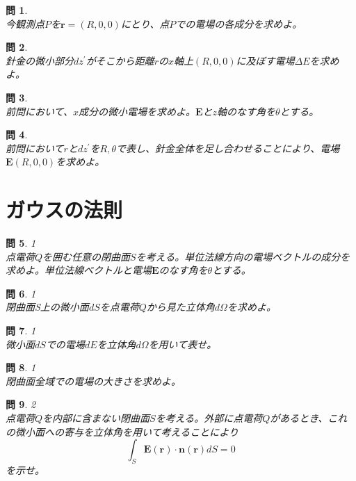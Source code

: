 \documentclass{jsarticle}
\newtheorem{pro}{問}[section]
\begin{document}
\begin{pro}~\\
今観測点\(P\)を\(\bm{r}=(R,0,0)\)にとり、点\(P\)での電場の各成分を求めよ。
\end{pro}

\begin{pro}~\\
針金の微小部分\(dz^{\prime}\)がそこから距離\(r\)の\(x\)軸上\((R,0,0)\)に及ぼす電場\(\Delta E\)を求めよ。
\end{pro}

\begin{pro}~\\
前問において、\(x\)成分の微小電場を求めよ。\(\bm{E}\)と\(z\)軸のなす角を\(\theta\)とする。
\end{pro}

\begin{pro}~\\
前問において\(r\)と\(dz^{\prime}\)を\(R,\theta\)で表し、針金全体を足し合わせることにより、電場\(\bm{E}(R,0,0)\)を求めよ。
\end{pro}

\section{ガウスの法則}
\noindent
\begin{pro}1\\
点電荷\(Q\)を囲む任意の閉曲面\(S\)を考える。単位法線方向の電場ベクトルの成分を求めよ。単位法線ベクトルと電場\(\bm{E}\)のなす角を\(\theta\)とする。
\end{pro}

\begin{pro}1\\
閉曲面S上の微小面\(dS\)を点電荷\(Q\)から見た立体角\(d\Omega\)を求めよ。
\end{pro}

\begin{pro}1\\
微小面\(dS\)での電場\(dE\)を立体角\(d\Omega\)を用いて表せ。
\end{pro}
\begin{pro}1\\
閉曲面全域での電場の大きさを求めよ。
\end{pro}

\begin{pro}2\\
点電荷\(Q\)を内部に含まない閉曲面\(S\)を考える。外部に点電荷\(Q\)があるとき、これの微小面への寄与を立体角を用いて考えることにより
\[\int_{S}\bm{E}(\bm{r})\cdot\bm{n}(\bm{r})dS=0\]
を示せ。
\end{pro}
\end{document}
